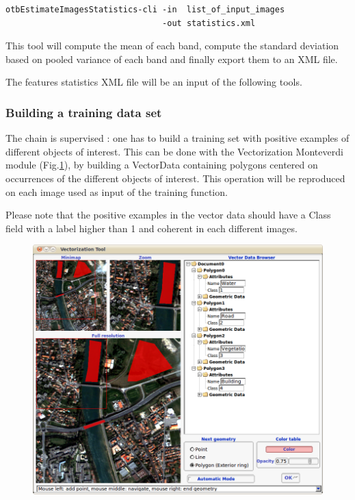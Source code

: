 \begin{verbatim}
otbEstimateImagesStatistics-cli -in  list_of_input_images 
                                -out statistics.xml
\end{verbatim}

This tool will compute the mean of each band, compute the standard deviation based on pooled variance of each band and finally export them to an XML file.

The features statistics XML file will be an input of the following tools. 

\subsubsection{Building a training data set}

The chain is supervised : one has to build a training set with positive examples of different objects of interest. This can be done with the Vectorization Monteverdi module (Fig.\ref{fig:vectoModuleDataSetCreation}), by building a VectorData containing polygons centered on occurrences of the different objects of interest. This operation will be reproduced on each image used as input of the training function.

Please note that the positive examples in the vector data should have a Class field with a label higher than 1 and coherent in each different images. 

\begin{figure}
  \center
  \includegraphics[width=1\textwidth]{../Art/MonteverdiImages/monteverdi_vectorization_module_for_classification.png}
  \label{fig:vectoModuleDataSetCreation}
\end{figure}

